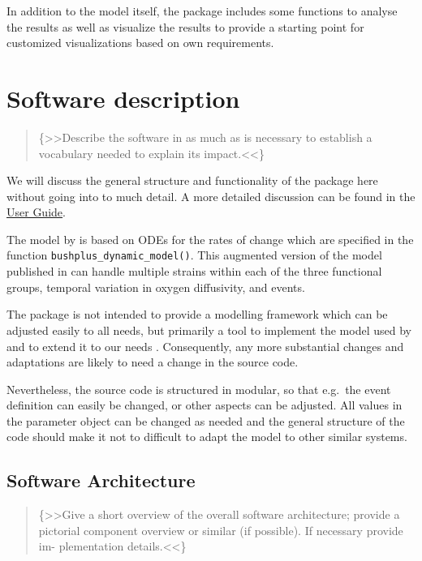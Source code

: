 \documentclass[]{elsarticle} %
\begin{document}
In addition to the model itself, the package includes some functions to
analyse the results as well as visualize the results to provide a
starting point for customized visualizations based on own requirements.

\hypertarget{software-description}{%
\section{Software description}\label{software-description}}

\begin{quote}
\{\textgreater\textgreater Describe the software in as much as is
necessary to establish a vocabulary needed to explain its
impact.\textless\textless\}
\end{quote}

We will discuss the general structure and functionality of the package
here without going into to much detail. A more detailed discussion can
be found in the \href{LINK_NEEDED}{User Guide}.

The model by \citet{Bush2017} is based on ODEs for the rates of change
which are specified in the function \texttt{bushplus\_dynamic\_model()}.
This augmented version of the model published in \citep{Bush2017} can
handle multiple strains within each of the three functional groups,
temporal variation in oxygen diffusivity, and events.

The package is not intended to provide a modelling framework which can
be adjusted easily to all needs, but primarily a tool to implement the
model used by \citep{Bush2017} and to extend it to our needs
\citep{REF_NEEDED}. Consequently, any more substantial changes and
adaptations are likely to need a change in the source code.

Nevertheless, the source code is structured in modular, so that e.g.~the
event definition can easily be changed, or other aspects can be
adjusted. All values in the parameter object can be changed as needed
and the general structure of the code should make it not to difficult to
adapt the model to other similar systems.

\hypertarget{software-architecture}{%
\subsection{Software Architecture}\label{software-architecture}}

\begin{quote}
\{\textgreater\textgreater Give a short overview of the overall software
architecture; provide a pictorial component overview or similar (if
possible). If necessary provide im- plementation
details.\textless\textless\}
\end{quote}
\end{document}
